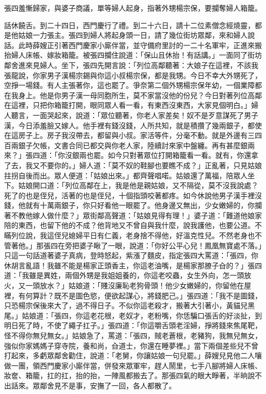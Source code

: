 張四羞慚歸家，與婆子商議，單等婦人起身，指著外甥楊宗保，要攔奪婦人箱籠。

話休饒舌。到二十四日，西門慶行了禮。到二十六日，請十二位素僧念經燒靈，都是他姑娘一力張主。張四到婦人將起身頭一日，請了幾位街坊眾鄰，來和婦人說話。此時薛嫂正引著西門慶家小廝伴當，並守備府里討的一二十名軍牢，正進來搬抬婦人床帳、嫁妝箱籠。被張四攔住說道：「保山且休抬！有話講。」一面同了街坊鄰舍進來見婦人。坐下，張四先開言說：「列位高鄰聽著：大娘子在這裡，不該我張龍說，你家男子漢楊宗錫與你這小叔楊宗保，都是我甥。今日不幸大外甥死了，空掙一場錢。有人主張著你，這也罷了。爭奈第二個外甥楊宗保年幼，一個業障都在我身上。他是你男子漢一母同胞所生，莫不家當沒他的份兒？今日對著列位高鄰在這裡，只把你箱籠打開，眼同眾人看一看，有東西沒東西，大家見個明白。」婦人聽言，一面哭起來，說道：「眾位聽著，你老人家差矣！奴不是歹意謀死了男子漢，今日添羞臉又嫁人。他手裡有錢沒錢，人所共知，就是積攢了幾兩銀子，都使在這房子上。房子我沒帶去，都留與小叔。家活等件，分毫不動。就是外邊有三四百兩銀子欠帳，文書合同已都交與你老人家，陸續討來家中盤纏。再有甚麼銀兩來？」張四道：「你沒銀兩也罷。如今只對著眾位打開箱籠看一看。就有，你還拿了去，我又不要你的。」婦人道：「莫不奴的鞋腳也要瞧不成？」正亂著，只見姑娘拄拐自後而出。眾人便道：「姑娘出來。」都齊聲唱喏。姑娘還了萬福，陪眾人坐下。姑娘開口道：「列位高鄰在上，我是他是親姑娘，又不隔從，莫不沒我說處？死了的也是侄兒，活著的也是侄兒，十個指頭咬著都疼。如今休說他男子漢手裡沒錢，他就有十萬兩銀子，你只好看他一眼罷了。他身邊又無出，少女嫩婦的，你攔著不教他嫁人做什麼？」眾街鄰高聲道：「姑娘見得有理！」婆子道：「難道他娘家陪的東西，也留下他的不成？他背地又不曾自與我什麼，說我護他，也要公道。不瞞列位說，我這侄兒媳婦平日有仁義，老身捨不得他，好溫克性兒。不然老身也不管著他。」那張四在旁把婆子瞅了一眼，說道：「你好公平心兒！鳳凰無寶處不落。」只這一句話道著婆子真病，登時怒起，紫漲了麵皮，指定張四大罵道：「張四，你休胡言亂語！我雖不能是楊家正頭香主，你這老油嘴，是楊家那膫子㒲的？」張四道：「我雖是異姓，兩個外甥是我姐姐養的，你這老咬蟲，女生外向，怎一頭放火，又一頭放水？」姑娘道：「賤沒廉恥老狗骨頭！他少女嫩婦的，你留他在屋裡，有何算計？既不是圖色慾，便欲起謀心，將錢肥己。」張四道：「我不是圖錢，只恐楊宗保後來大了，過不得日子。不似你這老殺才，搬著大引著小，黃貓兒黑尾。」姑娘道：「張四，你這老花根，老奴才，老粉嘴，你恁騙口張舌的好淡扯，到明日死了時，不使了繩子扛子。」張四道：「你這嚼舌頭老淫婦，掙將錢來焦尾靶，怪不得你無兒無女。」姑娘急了，罵道：「張四，賊老蒼根，老豬狗，我無兒無女，強似你家媽媽子穿寺院，養和尚，㒲道士，你還在睡夢裡。」當下兩個差些兒不曾打起來，多虧眾鄰舍勸住，說道：「老舅，你讓姑娘一句兒罷。」薛嫂兒見他二人嚷做一團，領西門慶家小廝伴當，併發來眾軍牢，趕人鬧里，七手八腳將婦人床帳、妝奩、箱籠，扛的扛，抬的抬，一陣風都搬去了。那張四氣的眼大睜著，半晌說不出話來。眾鄰舍見不是事，安撫了一回，各人都散了。

